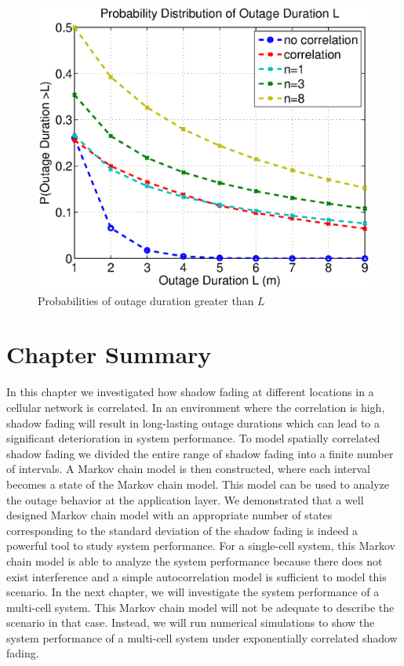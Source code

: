 \begin{figure}
\centering
\includegraphics[width=12cm]{result_Plot_new.eps}
\caption{Probabilities of outage duration greater than $L$}
\label{prob}
\end{figure}

\section{Chapter Summary}
\label{sec:conclusion}
\par In this chapter we investigated how shadow fading at different locations in a cellular network is correlated. In an environment where the correlation is high, shadow fading will result in long-lasting outage durations which can lead to a significant deterioration in system performance. To model spatially correlated shadow fading we divided the entire range of shadow fading into a finite number of intervals. A Markov chain model is then constructed, where each interval becomes a state of the Markov chain model. This model can be used to analyze the  outage behavior at the application layer. We demonstrated that a well designed Markov chain model with an appropriate number of states corresponding to the standard deviation of the shadow fading is indeed a powerful tool to study system performance. For a single-cell system, this Markov chain model is able to analyze the system performance because there does not exist interference and a simple autocorrelation model is sufficient to model this scenario. In the next chapter, we will investigate the system performance of a multi-cell system. This Markov chain model will not be adequate to describe the scenario in that case. Instead, we will run numerical simulations to show the system performance of a multi-cell system under exponentially correlated shadow fading.

